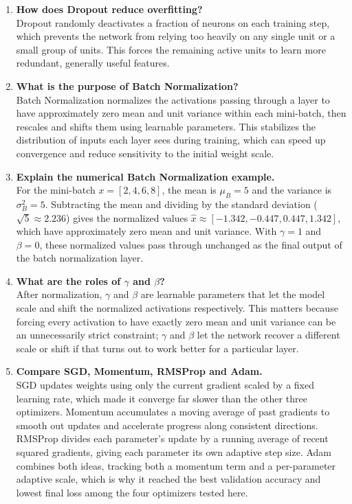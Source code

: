 \documentclass[10pt]{article}
\begin{document}
\begin{enumerate}
\item \textbf{How does Dropout reduce overfitting?}\\
Dropout randomly deactivates a fraction of neurons on each training
step, which prevents the network from relying too heavily on any
single unit or a small group of units. This forces the remaining active units to learn more redundant, generally useful features.\\

\item \textbf{What is the purpose of Batch Normalization?}\\
Batch Normalization normalizes the activations passing through a layer to have approximately zero mean and unit variance within each
mini-batch, then rescales and shifts them using learnable parameters.
This stabilizes the distribution of inputs each layer sees during
training, which can speed up convergence and reduce sensitivity to the
initial weight scale.\\

\item \textbf{Explain the numerical Batch Normalization example.}\\
For the mini-batch $x = [2, 4, 6, 8]$, the mean is $\mu_B = 5$ and the
variance is $\sigma_B^2 = 5$. Subtracting the mean and dividing by the
standard deviation ($\sqrt{5} \approx 2.236$) gives the normalized
values $\hat{x} \approx [-1.342, -0.447, 0.447, 1.342]$, which have
approximately zero mean and unit variance. With $\gamma = 1$ and
$\beta = 0$, these normalized values pass through unchanged as the
final output of the batch normalization layer.\\

\item \textbf{What are the roles of $\gamma$ and $\beta$?}\\
After normalization, $\gamma$ and $\beta$ are learnable parameters that
let the model scale and shift the normalized activations respectively. This matters because forcing every activation to have exactly zero mean and unit variance can be an unnecessarily strict constraint; $\gamma$ and $\beta$ let the network recover a different scale or shift if that
turns out to work better for a particular layer.\\

\item \textbf{Compare SGD, Momentum, RMSProp and Adam.}\\
SGD updates weights using only the current gradient scaled by a fixed
learning rate, which made it converge far slower than the other three
optimizers. Momentum accumulates a moving average of past gradients to smooth out updates and accelerate progress along
consistent directions. RMSProp divides each parameter's update by a
running average of recent squared gradients, giving each parameter its
own adaptive step size. Adam combines both ideas, tracking both a
momentum term and a per-parameter adaptive scale, which is why it
reached the best validation accuracy and lowest final loss among the
four optimizers tested here.\\


\end{enumerate}
\end{document}
